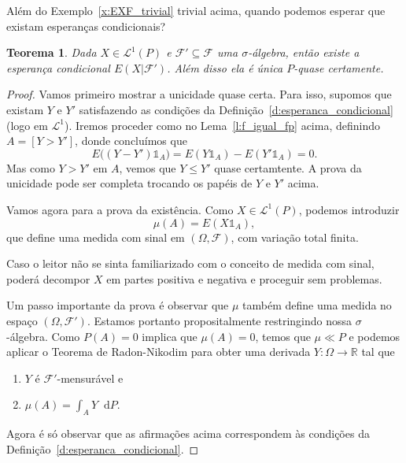 \documentclass[reqno, draft]{book}
\newcommand*\1{\mathds{1}}
\newtheorem{theorem}{Teorema}[section]
\renewcommand*\d{\mathop{}\!\mathrm{d}}
\begin{document}
Além do Exemplo~\ref{x:EXF_trivial} trivial acima, quando podemos esperar que existam esperanças condicionais?

\begin{theorem}
  Dada $X \in \mathcal{L}^1(P)$ e $\mathcal{F}' \subseteq \mathcal{F}$ uma $\sigma$-álgebra, então existe a esperança condicional $E(X|\mathcal{F}')$.
  Além disso ela é única $P$-quase certamente.
\end{theorem}

\begin{proof}
  Vamos primeiro mostrar a unicidade quase certa.
  Para isso, supomos que existam $Y$ e $Y'$ satisfazendo as condições da Definição~\ref{d:esperanca_condicional} (logo em $\mathcal{L}^1$).
  Iremos proceder como no Lema~\ref{l:f_igual_fp} acima, definindo $A = [Y > Y']$, donde concluímos que
  \begin{equation}
    E\big( (Y - Y')\1_{A} \big) = E(Y \1_{A}) - E(Y' \1_{A}) = 0.
  \end{equation}
  Mas como $Y > Y'$ em $A$, vemos que $Y \leq Y'$ quase certamtente.
  A prova da unicidade pode ser completa trocando os papéis de $Y$ e $Y'$ acima.

  Vamos agora para a prova da existência.
  Como $X \in \mathcal{L}^1(P)$, podemos introduzir
  \begin{equation}
    \mu(A) = E(X \1_{A}),
  \end{equation}
  que define uma medida com sinal em $(\Omega, \mathcal{F})$, com variação total finita.

  Caso o leitor não se sinta familiarizado com o conceito de medida com sinal, poderá decompor $X$ em partes positiva e negativa e proceguir sem problemas.

  Um passo importante da prova é observar que $\mu$ também define uma medida no espaço $(\Omega, \mathcal{F}')$.
  Estamos portanto propositalmente restringindo nossa $\sigma$-álgebra.
  Como $P(A) = 0$ implica que $\mu(A) = 0$, temos que $\mu \ll P$ e podemos aplicar o Teorema de Radon-Nikodim para obter uma derivada $Y:\Omega \to \mathbb{R}$ tal que
  \begin{enumerate}[\quad a)]
  \item $Y$ é $\mathcal{F}'$-mensurável e
  \item $\mu(A) = \int_A Y \d P$.
  \end{enumerate}
  Agora é só observar que as afirmações acima correspondem às condições da Definição~\ref{d:esperanca_condicional}.
\end{proof}
\end{document}
